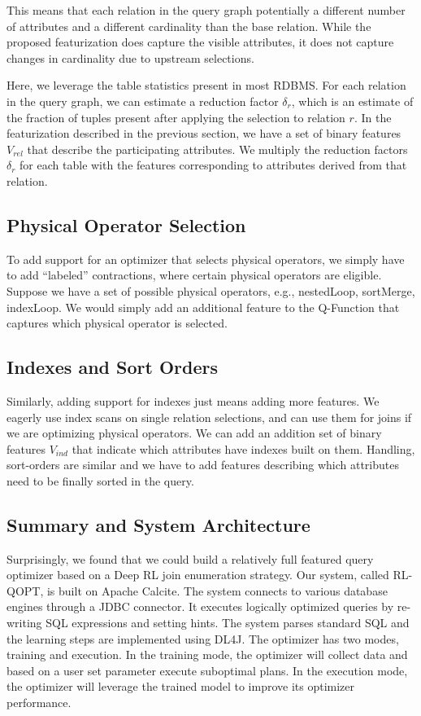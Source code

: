 This means that each relation in the query graph potentially a different number of attributes and a different cardinality than the base relation. While the proposed featurization does capture the visible attributes, it does not capture changes in cardinality due to upstream selections. 

Here, we leverage the table statistics present in most RDBMS. For each relation in the query graph, we can estimate a reduction factor $\delta_{r}$, which is an estimate of the fraction of tuples present after applying the selection to relation $r$. 
In the featurization described in the previous section, we have a set of binary features $V_{rel}$ that describe the participating attributes.
We multiply the reduction factors $\delta_r$ for each table with the features corresponding to attributes derived from that relation.

\subsection*{Physical Operator Selection}
To add support for an optimizer that selects physical operators, we simply have to add ``labeled'' contractions, where certain physical operators are eligible. Suppose we have a set of possible physical operators, e.g., \textsf{nestedLoop}, \textsf{sortMerge}, \textsf{indexLoop}. We would simply add an additional feature to the Q-Function that captures which physical operator is selected.

\subsection*{Indexes and Sort Orders}
Similarly, adding support for indexes just means adding more features. We eagerly use index scans on single relation selections, and can use them for joins if we are optimizing physical operators. We can add an addition set of binary features $V_{ind}$ that indicate which attributes have indexes built on them. Handling, sort-orders are similar and we have to add features describing which attributes need to be finally sorted in the query.

\subsection*{Summary and System Architecture}
Surprisingly, we found that we could build a relatively full featured query optimizer based on a Deep RL join enumeration strategy.
Our system, called RL-QOPT, is built on Apache Calcite.
The system connects to various database engines through a JDBC connector. It executes logically optimized queries by re-writing SQL expressions and setting hints.
The system parses standard SQL and the learning steps are implemented using \textsf{DL4J}.
The optimizer has two modes, training and execution. In the training mode, the optimizer will collect data and based on a user set parameter execute suboptimal plans. In the execution mode, the optimizer will leverage the trained model to improve its optimizer performance.


